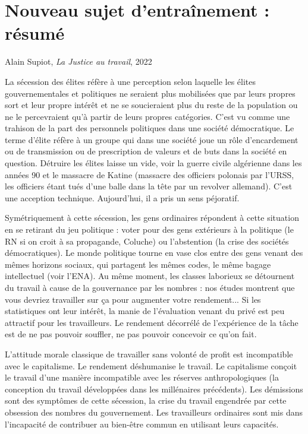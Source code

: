 \documentclass[a4paper,12pt]{book}
\begin{document}
\section{Nouveau sujet d'entraînement : résumé}
Alain Supiot, \textit{La Justice au travail}, 2022
\par La sécession des élites réfère à une perception selon laquelle les élites gouvernementales et politiques ne seraient plus mobilisées que par leurs propres sort et leur propre intérêt et ne se soucieraient plus du reste de la population ou ne le percevraient qu'à partir de leurs propres catégories. C'est vu comme une trahison de la part des personnels politiques dans une société démocratique. Le terme d'élite réfère à un groupe qui dans une société joue un rôle d'encardement ou de transmission ou de prescription de valeurs et de buts dans la société en question. Détruire les élites laisse un vide, voir la guerre civile algérienne dans les années 90 et le massacre de Katine (massacre des officiers polonais par l'URSS, les officiers étant tués d'une balle dans la tête par un revolver allemand). C'est une acception technique. Aujourd'hui, il a pris un sens péjoratif. \par Symétriquement à cette sécession, les gens ordinaires répondent à cette situation en se retirant du jeu politique : voter pour des gens extérieurs à la politique (le RN si on croit à sa propagande, Coluche) ou l'abstention (la crise des sociétés démocratiques). Le monde politique tourne en vase clos entre des gens venant des mêmes horizons sociaux, qui partagent les mêmes codes, le même bagage intellectuel (voir l'ENA). Au même moment, les classes laborieux se détournent du travail à cause de la gouvernance par les nombres : nos études montrent que vous devriez travailler sur ça pour augmenter votre rendement... Si les statistiques ont leur intérêt, la manie de l'évaluation venant du privé est peu attractif pour les travailleurs. Le rendement décorrélé de l'expérience de la tâche est de ne pas pouvoir souffler, ne pas pouvoir concevoir ce qu'on fait. \par L'attitude morale classique de travailler sans volonté de profit est incompatible avec le capitalisme. Le rendement déshumanise le travail. Le capitalisme conçoit le travail d'une manière incompatible avec les réserves anthropologiques (la conception du travail développées dans les millénaires précédents). Les démissions sont des symptômes de cette sécession, la crise du travail engendrée par cette obsession des nombres du gouvernement. Les travailleurs ordinaires sont mis dans l'incapacité de contribuer au bien-être commun en utilisant leurs capacités.  
\end{document}
